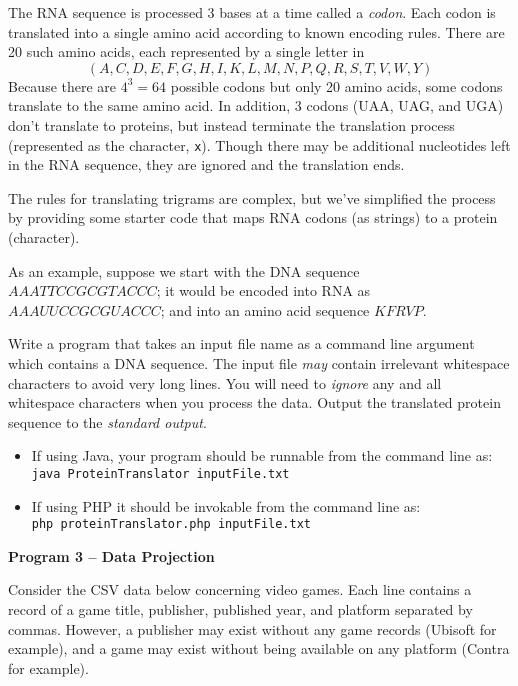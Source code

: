 \documentclass[12pt]{exam}
\begin{document}
\begin{questions}
The RNA sequence is processed 3 bases at a time called a \emph{codon}.  
Each codon is translated into a single amino acid according to known 
encoding rules.  There are 20 such amino acids, each represented by a 
single letter in 
 $$(A,C,D,E,F,G,H,I,K,L,M,N,P,Q,R,S,T,V,W,Y)$$
Because there are $4^3 = 64$ possible codons but only 20 amino acids,
some codons translate to the same amino acid.  In addition, 3 codons
(UAA, UAG, and UGA) don't translate to proteins, but instead terminate 
the translation process (represented as the character, \texttt{x}).
Though there may be additional nucleotides left in the RNA sequence, 
they are ignored and the translation ends.  

The rules for translating trigrams are complex, but we've simplified
the process by providing some starter code that maps RNA codons (as
strings) to a protein (character).

As an example, suppose we start with the DNA sequence $AAATTCCGCGTACCC$; 
it would be encoded into RNA as $AAAUUCCGCGUACCC$; and into an amino 
acid sequence $KFRVP$.

Write a program that takes an input file name as a command line argument
which contains a DNA sequence.  The input file \emph{may} contain 
irrelevant whitespace characters to avoid very long lines.  You will 
need to \emph{ignore} any and all whitespace characters when you 
process the data.  Output the translated protein sequence to the
\emph{standard output}.  

\begin{itemize}
  \item If using Java, your program should be runnable from the command 
    line as:\\
	\texttt{java ProteinTranslator inputFile.txt}
  \item If using PHP it should be invokable from the command line as:\\
	\texttt{php proteinTranslator.php inputFile.txt}
\end{itemize}

\newpage
\question \textbf{Program 3 -- Data Projection}

Consider the CSV data below concerning video games. Each line 
contains a record of a game title, publisher, published year, 
and platform separated by commas.  However, a publisher may exist without
any game records (Ubisoft for example), and a game may exist without being
available on any platform (Contra for example).


\end{questions}
\end{document}
